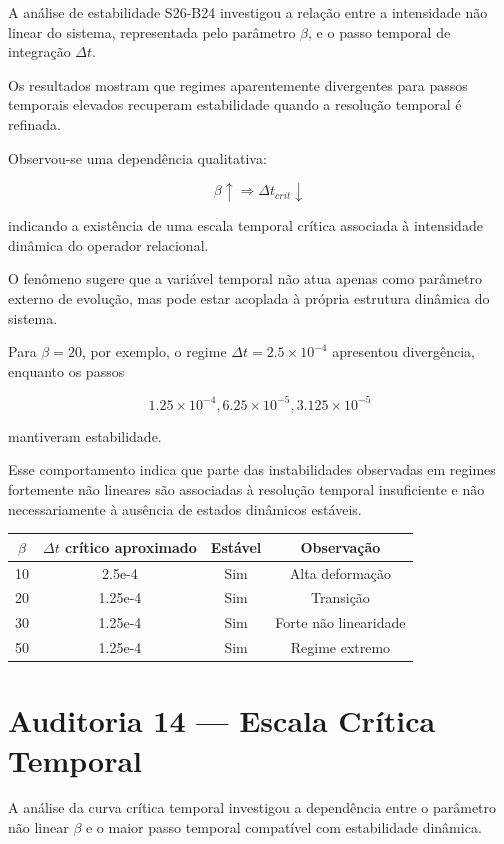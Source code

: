 \documentclass[11pt,a4paper]{article}
\begin{document}
A análise de estabilidade S26-B24 investigou a relação entre
a intensidade não linear do sistema, representada pelo parâmetro
$\beta$, e o passo temporal de integração $\Delta t$.

Os resultados mostram que regimes aparentemente divergentes
para passos temporais elevados recuperam estabilidade quando
a resolução temporal é refinada.

Observou-se uma dependência qualitativa:

\[
\beta \uparrow
\Rightarrow
\Delta t_{crit} \downarrow
\]

indicando a existência de uma escala temporal crítica associada
à intensidade dinâmica do operador relacional.

O fenômeno sugere que a variável temporal não atua apenas como
parâmetro externo de evolução, mas pode estar acoplada à própria
estrutura dinâmica do sistema.

Para $\beta=20$, por exemplo, o regime
$\Delta t=2.5\times10^{-4}$ apresentou divergência,
enquanto os passos

\[
1.25\times10^{-4},
6.25\times10^{-5},
3.125\times10^{-5}
\]

mantiveram estabilidade.

Esse comportamento indica que parte das instabilidades observadas
em regimes fortemente não lineares são associadas à resolução
temporal insuficiente e não necessariamente à ausência de estados
dinâmicos estáveis.
\begin{table}[h]
\centering
\begin{tabular}{cccc}
\toprule
$\beta$ & $\Delta t$ crítico aproximado & Estável & Observação\\
\midrule
10 & 2.5e-4 & Sim & Alta deformação\\
20 & 1.25e-4 & Sim & Transição\\
30 & 1.25e-4 & Sim & Forte não linearidade\\
50 & 1.25e-4 & Sim & Regime extremo\\
\bottomrule
\end{tabular}
\end{table}
\section{Auditoria 14 — Escala Crítica Temporal}

A análise da curva crítica temporal investigou a dependência
entre o parâmetro não linear $\beta$ e o maior passo temporal
compatível com estabilidade dinâmica.
\end{document}
